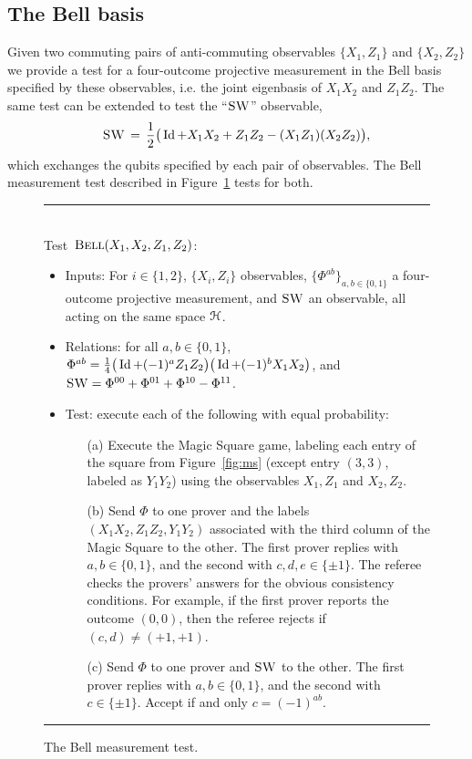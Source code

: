 \subsection{The Bell basis}
\label{sec:bell}

Given two commuting pairs of anti-commuting observables $\{X_1,Z_1\}$ and $\{X_2,Z_2\}$ we provide a test for a four-outcome projective measurement in the Bell basis specified by these observables, i.e. the joint eigenbasis of $X_1X_2$ and $Z_1Z_2$. The same test can be extended to test the ``$\textsc{SW}$'' observable,
\begin{equation}\label{eq:def-swap}
 \textsc{SW} \,=\, \frac{1}{2} \big( \mathop{\rm Id}\nolimits + X_1X_2 + Z_1Z_2 - (X_1Z_1)(X_2Z_2) \big),
\end{equation}
 which exchanges the  qubits specified by each pair of observables. The Bell measurement test described in Figure~\ref{fig:bell} tests for both. 


\begin{figure}[H]
\rule[1ex]{\textwidth}{0.5pt}\\
\justifying
Test~$\textsc{Bell}(X_1,X_2,Z_1,Z_2)$:
\begin{itemize}
    \item Inputs: For $i\in\{1,2\}$, $\{X_i,Z_i\}$ observables, $\{\Phi^{ab}\}_{a,b\in\{0,1\}}$ a four-outcome projective measurement, and $\textsc{SW}$ an observable, all acting on the same space $\mathcal{H}$.
    \item Relations: for all $a,b\in\{0,1\}$, $\Phi^{ab} = \frac{1}{4}\big(\mathop{\rm Id}\nolimits+(-1)^a Z_1Z_2\big)\big(\mathop{\rm Id}\nolimits+(-1)^bX_1X_2\big)$, and $\textsc{SW} = \Phi^{00} + \Phi^{01} + \Phi^{10} - \Phi^{11}$.   
    \item Test: execute each of the following with equal probability:
		\begin{enumerate}
		\item[(a)] Execute the Magic Square game, labeling each entry of the square from Figure~\ref{fig:ms} (except entry $(3,3)$, labeled as $Y_1Y_2$) using the observables $X_1,Z_1$ and $X_2,Z_2$.
		\item[(b)] Send $\Phi$ to one prover and the labels $(X_1X_2,Z_1Z_2,Y_1Y_2)$ associated with the third column of the Magic Square to the other.  The first prover replies with $a,b\in\{0,1\}$, and the second with $c,d,e\in \{\pm 1\}$. The referee checks the provers' answers for the obvious consistency conditions. For example, if the first prover reports the outcome $(0,0)$, then the referee rejects if $(c,d)\neq (+1,+1)$. 
		\item[(c)] Send $\Phi$ to one prover and $\textsc{SW}$ to the other. The first prover replies with $a,b\in\{0,1\}$, and the second with $c\in \{\pm 1\}$. Accept if and only $c=(-1)^{ab}$. 
		\end{enumerate}
\end{itemize}
\rule[2ex]{\textwidth}{0.5pt}\vspace{-.5cm}
\caption{The Bell measurement test.}
\label{fig:bell}
\end{figure}


